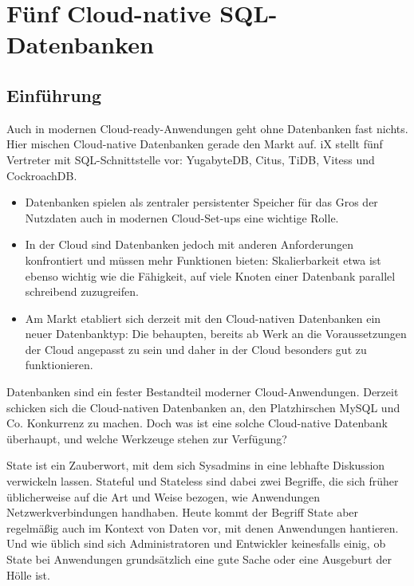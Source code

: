 %
%
%
%




\chapter{Fünf Cloud-native SQL-Datenbanken}

\section{Einführung}


Auch in modernen Cloud-ready-Anwendungen geht ohne Datenbanken fast nichts. Hier mischen Cloud-native Datenbanken gerade den Markt auf. iX stellt fünf Vertreter mit SQL-Schnittstelle vor: YugabyteDB, Citus, TiDB, Vitess und CockroachDB.

\begin{itemize}
  \item Datenbanken spielen als zentraler persistenter Speicher für das Gros der Nutzdaten auch in modernen Cloud-Set-ups eine wichtige Rolle.
  \item In der Cloud sind Datenbanken jedoch mit anderen Anforderungen konfrontiert und müssen mehr Funktionen bieten: Skalierbarkeit etwa ist ebenso wichtig wie die Fähigkeit, auf viele Knoten einer Datenbank parallel schreibend zuzugreifen.
  \item Am Markt etabliert sich derzeit mit den Cloud-nativen Datenbanken ein neuer Datenbanktyp: Die behaupten, bereits ab Werk an die Voraussetzungen der Cloud angepasst zu sein und daher in der Cloud besonders gut zu funktionieren.
\end{itemize}

Datenbanken sind ein fester Bestandteil moderner Cloud-Anwendungen. Derzeit schicken sich die Cloud-nativen Datenbanken an, den Platzhirschen MySQL und Co. Konkurrenz zu machen. Doch was ist eine solche Cloud-native Datenbank überhaupt, und welche Werkzeuge stehen zur Verfügung?

State ist ein Zauberwort, mit dem sich Sysadmins in eine lebhafte Diskussion verwickeln lassen. Stateful und Stateless sind dabei zwei Begriffe, die sich früher üblicherweise auf die Art und Weise bezogen, wie Anwendungen Netzwerkverbindungen handhaben. Heute kommt der Begriff State aber regelmäßig auch im Kontext von Daten vor, mit denen Anwendungen hantieren. Und wie üblich sind sich Administratoren und Entwickler keinesfalls einig, ob State bei Anwendungen grundsätzlich eine gute Sache oder eine Ausgeburt der Hölle ist.

